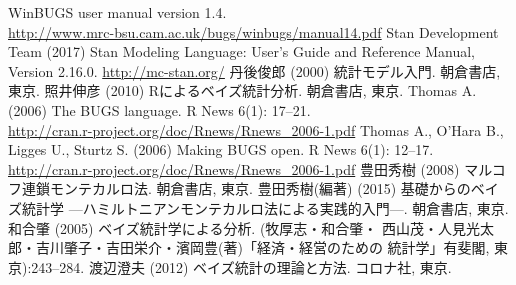 \documentclass[11pt,uplatex]{jsarticle}
\begin{document}
\begin{thebibliography}{99}
  WinBUGS user manual version 1.4.\\
  \url{http://www.mrc-bsu.cam.ac.uk/bugs/winbugs/manual14.pdf}
 Stan Development Team (2017) Stan Modeling Language:
  User's Guide and Reference Manual, Version 2.16.0.
  \url{http://mc-stan.org/}
 丹後俊郎 (2000) 統計モデル入門. 朝倉書店, 東京.
 照井伸彦 (2010) Rによるベイズ統計分析. 朝倉書店, 東京.
 Thomas A. (2006) The BUGS language.
  R News 6(1): 17--21. \\
  \url{http://cran.r-project.org/doc/Rnews/Rnews_2006-1.pdf}
 Thomas A., O'Hara B., Ligges U., Sturtz S. (2006) Making BUGS open.
  R News 6(1): 12--17. \\
  \url{http://cran.r-project.org/doc/Rnews/Rnews_2006-1.pdf}
 豊田秀樹 (2008) マルコフ連鎖モンテカルロ法. 朝倉書店, 東京.
 豊田秀樹(編著) (2015) 基礎からのベイズ統計学
  ---ハミルトニアンモンテカルロ法による実践的入門---. 朝倉書店, 東京.
 和合肇 (2005) ベイズ統計学による分析. (牧厚志・和合肇・
  西山茂・人見光太郎・吉川肇子・吉田栄介・濱岡豊(著)「経済・経営のための
  統計学」有斐閣, 東京):243--284.
 渡辺澄夫 (2012) ベイズ統計の理論と方法. コロナ社, 東京.
\end{thebibliography}
\end{document}
